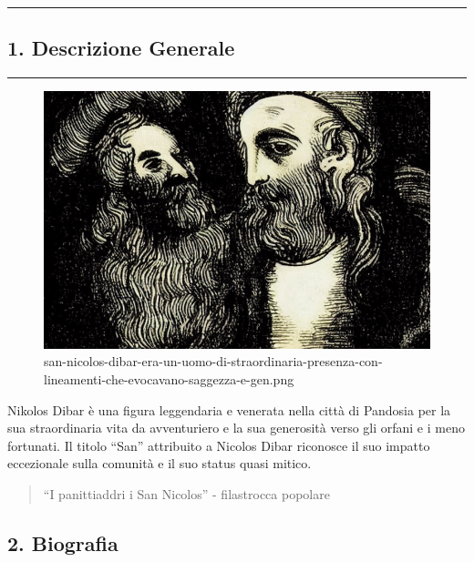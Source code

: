 \begin{center}\rule{0.5\linewidth}{0.5pt}\end{center}

\subsection{1. Descrizione Generale}\label{descrizione-generale}

\begin{center}\rule{0.5\linewidth}{0.5pt}\end{center}

\begin{figure}
\centering
\includegraphics{san-nicolos-dibar-era-un-uomo-di-straordinaria-presenza-con-lineamenti-che-evocavano-saggezza-e-gen.png}
\caption{san-nicolos-dibar-era-un-uomo-di-straordinaria-presenza-con-lineamenti-che-evocavano-saggezza-e-gen.png}
\end{figure}

Nikolos Dibar è una figura leggendaria e venerata nella città di
Pandosia per la sua straordinaria vita da avventuriero e la sua
generosità verso gli orfani e i meno fortunati. Il titolo ``San''
attribuito a Nicolos Dibar riconosce il suo impatto eccezionale sulla
comunità e il suo status quasi mitico.

\begin{quote}
``I panittiaddri i San Nicolos'' - filastrocca popolare
\end{quote}

\subsection{2. Biografia}\label{biografia}

